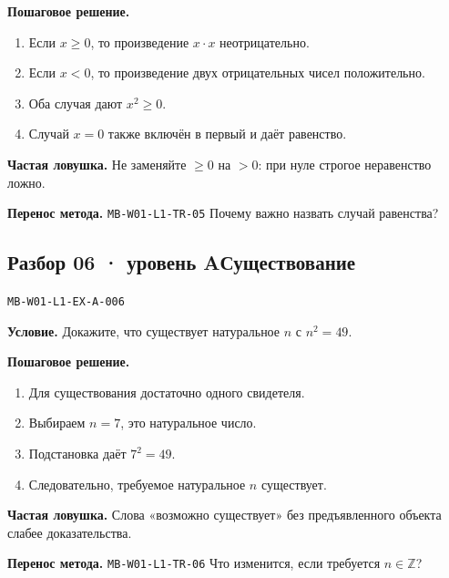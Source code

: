 \documentclass[11pt,a4paper,openany]{book}
\newcommand{\mtag}[1]{\textsf{\small\color{mbaccent}\bfseries #1}}
\newcommand{\muid}[1]{\texttt{\footnotesize #1}}
\begin{document}
\textbf{Пошаговое решение.}\par
\begin{enumerate}[label=\arabic*),leftmargin=*,itemsep=3pt,topsep=4pt]
\item Если $x\ge0$, то произведение $x\cdot x$ неотрицательно.
\item Если $x<0$, то произведение двух отрицательных чисел положительно.
\item Оба случая дают $x^2\ge0$.
\item Случай $x=0$ также включён в первый и даёт равенство.
\end{enumerate}


\begin{learnbox}\textbf{Частая ловушка.} Не заменяйте $\ge0$ на $>0$: при нуле строгое неравенство ложно.\par \textbf{Перенос метода.} \muid{MB-W01-L1-TR-05} Почему важно назвать случай равенства?\end{learnbox}

\subsection*{\mtag{Разбор 06 · уровень A}\quad Существование}\hypertarget{MB-W01-L1-EX-A-006}{}

\muid{MB-W01-L1-EX-A-006}\par

\begin{keybox}\textbf{Условие.} Докажите, что существует натуральное $n$ с $n^2=49$.\end{keybox}

\textbf{Пошаговое решение.}\par
\begin{enumerate}[label=\arabic*),leftmargin=*,itemsep=3pt,topsep=4pt]
\item Для существования достаточно одного свидетеля.
\item Выбираем $n=7$, это натуральное число.
\item Подстановка даёт $7^2=49$.
\item Следовательно, требуемое натуральное $n$ существует.
\end{enumerate}


\begin{learnbox}\textbf{Частая ловушка.} Слова «возможно существует» без предъявленного объекта слабее доказательства.\par \textbf{Перенос метода.} \muid{MB-W01-L1-TR-06} Что изменится, если требуется $n\in\mathbb Z$?\end{learnbox}
\end{document}
